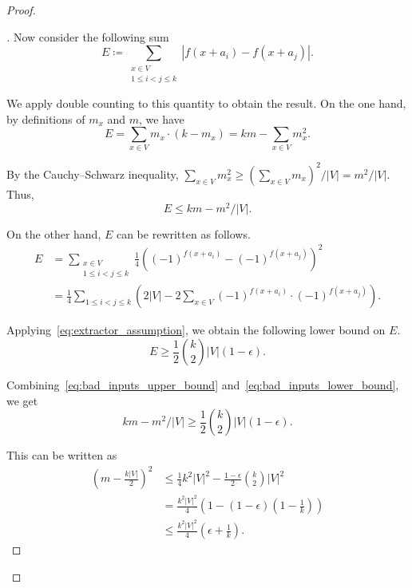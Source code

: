 \documentclass[10pt,a4paper]{article}
\theoremstyle{definition}
\theoremstyle{remark}
\newenvironment{claimproof}[1][\proofname]{\begin{proof}[#1]\renewcommand*{\qedsymbol}{$\blacksquare$}}{\end{proof}}
\newcommand{\card}[1]{{\left|#1\right|}}
\begin{document}
\begin{proof}
\begin{claimproof}
    Now consider the following sum
    \[
%
      E \coloneqq
      \sum_{\substack{x \in V \\ 1\le i<j \le k}} |f(x+a_i) - f(x+a_j)|.
    \]

    We apply double counting to this quantity to obtain the result.
    On the one hand, by definitions of $m_x$ and $m$, we have
    \begin{equation*}
      E = \sum_{x \in V} m_x \cdot (k - m_x) = k m - \sum_{x \in V} m_x^2.
    \end{equation*}
  
    By the Cauchy--Schwarz inequality, $\sum_{x \in V} m_x^2 \ge {\left(\sum_{x \in V} m_x\right)}^2 / \card{V} = m^2/\card{V}$. Thus,
    \begin{equation}\label{eq:bad_inputs_upper_bound}
      E \le km-m^2/\card{V}.
    \end{equation}
  
    On the other hand, $E$ can be rewritten as follows.
    \begin{equation*}
      \begin{aligned}
%
        E &=
        \sum_{\substack{x \in V \\ 1\le i<j \le k}} \frac{1}{4} {\left({(-1)}^{f(x+a_i)} - {(-1)}^{f(x+a_j)}\right)}^2 \\ &=
        \frac{1}{4} \sum_{1 \le i < j \le k} \left( 2\card{V} - 2\sum_{x\in V} {(-1)}^{f(x+a_i)} \cdot {(-1)}^{f(x+a_j)}\right).
      \end{aligned}
    \end{equation*}

    Applying~\eqref{eq:extractor_assumption}, we obtain the following lower bound on $E$.
    \begin{equation}\label{eq:bad_inputs_lower_bound}
      E \ge \frac{1}{2} \binom{k}{2} \card{V} (1-\epsilon).
    \end{equation}
  
    Combining~\eqref{eq:bad_inputs_upper_bound} and~\eqref{eq:bad_inputs_lower_bound}, we get
    \[
      km-m^2/\card{V} \ge \frac{1}{2} \binom{k}{2} \card{V} (1-\epsilon).
    \]
  
    This can be written as
    \begin{align*}
      {\left(m-\frac{k\card{V}}{2}\right)}^2 &\le
      \frac{1}{4} k^2 \card{V}^2 - \frac{1-\epsilon}{2}\binom{k}{2}\card{V}^2 \\ &=
      \frac{k^2 \card{V}^2}{4} \left(1 - (1-\epsilon)\left(1-\frac{1}{k}\right)\right) \\ &\le
      \frac{k^2 \card{V}^2}{4} \left(\epsilon + \frac{1}{k}\right).
    \end{align*}
  

\end{claimproof}
\end{proof}
\end{document}

